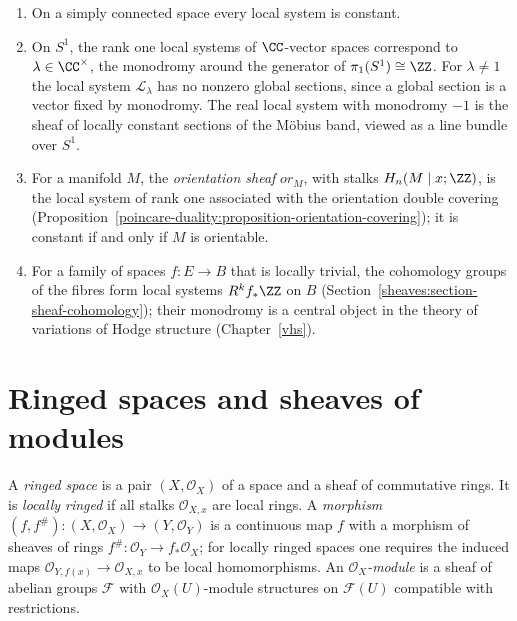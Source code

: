 \begin{example}\label{sheaves:example-local-systems}
\begin{enumerate}
\item On a simply connected space every local system is constant.
\item On $S^1$, the rank one local systems of $\CC$-vector spaces correspond to $\lambda \in \CC^\times$, the monodromy around the generator of $\pi_1(S^1) \cong \ZZ$. For
$\lambda \neq 1$ the local system $\mathcal{L}_\lambda$ has no nonzero global sections, since a global section is a vector fixed by monodromy. The real local system with monodromy $-1$ is the
sheaf of locally constant sections of the M\"obius band, viewed as a line bundle over $S^1$.
\item For a manifold $M$, the \emph{orientation sheaf} $\mathit{or}_M$, with stalks $H_n(M \mid x; \ZZ)$, is the local system of rank one associated with the orientation double covering
(Proposition~\ref{poincare-duality:proposition-orientation-covering}); it is constant if and only if $M$ is orientable.
\item For a family of spaces $f \colon E \to B$ that is locally trivial, the cohomology groups of the fibres form local systems $R^kf_*\ZZ$ on $B$ (Section~\ref{sheaves:section-sheaf-cohomology}); their
monodromy is a central object in the theory of variations of Hodge structure (Chapter~\ref{vhs}).
\end{enumerate}
\end{example}

\section{Ringed spaces and sheaves of modules}\label{sheaves:section-ringed-spaces}

\begin{definition}\label{sheaves:definition-ringed-space}
A \emph{ringed space} is a pair $(X, \mathcal{O}_X)$ of a space and a sheaf of commutative rings. It is \emph{locally ringed} if all stalks $\mathcal{O}_{X,x}$ are local rings. A
\emph{morphism} $(f, f^\#) \colon (X, \mathcal{O}_X) \to (Y, \mathcal{O}_Y)$ is a continuous map $f$ with a morphism of sheaves of rings $f^\# \colon \mathcal{O}_Y \to f_*\mathcal{O}_X$; for locally
ringed spaces one requires the induced maps $\mathcal{O}_{Y, f(x)} \to \mathcal{O}_{X, x}$ to be local homomorphisms. An \emph{$\mathcal{O}_X$-module} is a sheaf of abelian groups
$\mathcal{F}$ with $\mathcal{O}_X(U)$-module structures on $\mathcal{F}(U)$ compatible with restrictions.
\end{definition}

